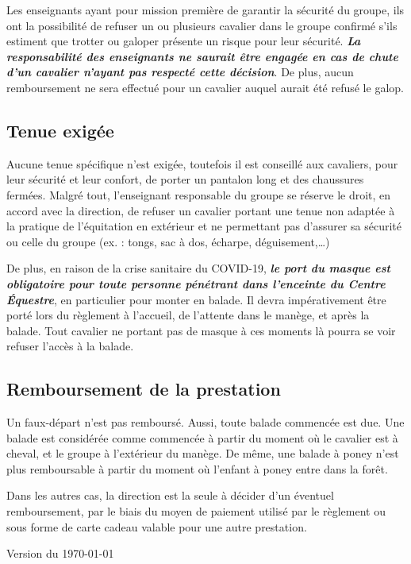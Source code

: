 \documentclass[11pt,a4paper]{article}
\renewcommand{\emph}[1]{\textit{\textbf{#1}}}
\begin{document}
Les enseignants ayant pour mission première de garantir la sécurité du groupe, ils ont la possibilité de refuser un ou plusieurs cavalier dans le groupe confirmé s'ils estiment que trotter ou galoper présente un risque pour leur sécurité. \emph{La responsabilité des enseignants ne saurait être engagée en cas de chute d'un cavalier n'ayant pas respecté cette décision}. De plus, aucun remboursement ne sera effectué pour un cavalier auquel aurait été refusé le galop.

\subsection*{Tenue exigée}
Aucune tenue spécifique n'est exigée, toutefois il est conseillé aux cavaliers, pour leur sécurité et leur confort, de porter un pantalon long et des chaussures fermées. Malgré tout, l'enseignant responsable du groupe se réserve le droit, en accord avec la direction, de refuser un cavalier portant une tenue non adaptée à la pratique de l'équitation en extérieur et ne permettant pas d'assurer sa sécurité ou celle du groupe (ex. : tongs, sac à dos, écharpe, déguisement,\dots)

De plus, en raison de la crise sanitaire du COVID-19, \emph{le port du masque est obligatoire pour toute personne pénétrant dans l'enceinte du Centre Équestre}, en particulier pour monter en balade. Il devra impérativement être porté lors du règlement à l'accueil, de l'attente dans le manège, et après la balade. Tout cavalier ne portant pas de masque à ces moments là pourra se voir refuser l'accès à la balade.

\subsection*{Remboursement de la prestation}
Un faux-départ n'est pas remboursé. Aussi, toute balade commencée est due. Une balade est considérée comme \og commencée \fg{} à partir du moment où le cavalier est à cheval, et le groupe à l'extérieur du manège. De même, une balade à poney n'est plus remboursable à partir du moment où l'enfant à poney entre dans la forêt.

Dans les autres cas, la direction est la seule à décider d'un éventuel remboursement, par le biais du moyen de paiement utilisé par le règlement ou sous forme de \og carte cadeau \fg{} valable pour une autre prestation.

\vfill
\begin{flushright}
	Version du \today
\end{flushright}
\end{document}
